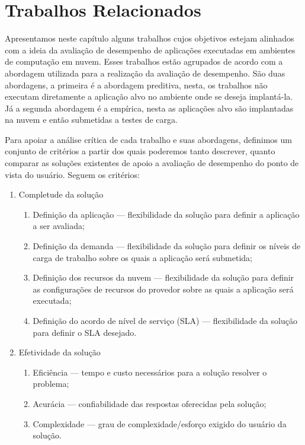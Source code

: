 \chapter[Trabalhos Relacionados]{Trabalhos Relacionados}
Apresentamos  neste capítulo alguns trabalhos cujos objetivos estejam alinhados 
com a ideia da avaliação de desempenho de aplicações executadas em ambientes de
computação em nuvem. Esses trabalhos estão agrupados de acordo com a abordagem utilizada para a realização da avaliação de desempenho. São duas abordagens, a primeira é a abordagem preditiva, nesta, os trabalhos não executam diretamente a aplicação alvo no ambiente onde se deseja implantá-la. Já a segunda abordagem é a empírica, nesta as aplicações alvo são implantadas na nuvem e então submetidas a testes de carga. 

Para apoiar a análise crítica de cada trabalho e suas abordagens, definimos um conjunto de critérios a partir dos quais poderemos tanto descrever, quanto comparar as soluções existentes de apoio a avaliação de desempenho do ponto de vista do usuário. Seguem os critérios:

\begin{enumerate}
  \item Completude da solução
  \begin{enumerate}
    \item Definição da aplicação --- flexibilidade da solução para
    definir a aplicação a ser avaliada;
    \item Definição da demanda --- flexibilidade da solução para
    definir os níveis de carga de trabalho sobre os quais a aplicação será
    submetida;
	\item Definição dos recursos da nuvem --- flexibilidade da solução para
	definir as configurações de recursos do provedor sobre as quais a aplicação
	será executada;
	\item Definição do acordo de nível de serviço (SLA) --- flexibilidade da
	solução para definir o SLA desejado.
  \end{enumerate}
  \item Efetividade da solução  
  \begin{enumerate}
    \item Eficiência --- tempo e custo necessários para a solução resolver o
    problema;
    \item Acurácia --- confiabilidade das respostas oferecidas pela solução;
	\item Complexidade --- grau de complexidade/esforço exigido do usuário da
	solução.
  \end{enumerate}
\end{enumerate}

